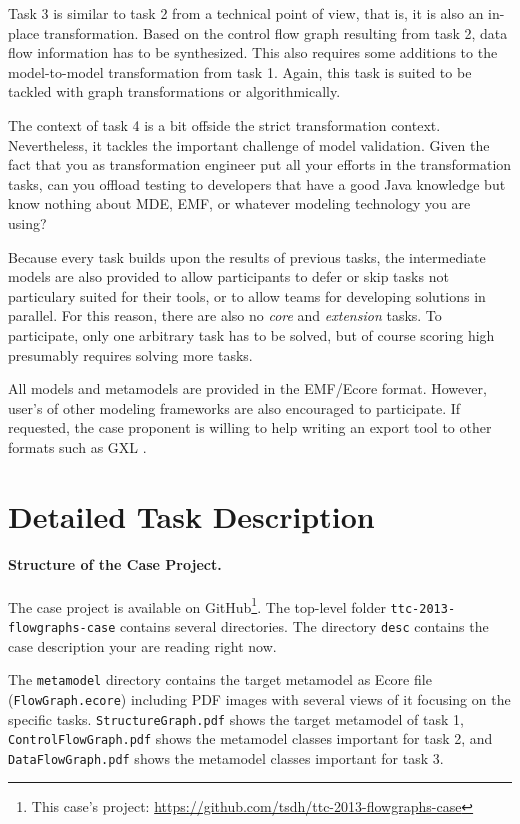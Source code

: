 \documentclass[10pt]{article}
\begin{document}
Task 3 is similar to task 2 from a technical point of view, that is, it is also
an in-place transformation.  Based on the control flow graph resulting from
task 2, data flow information has to be synthesized.  This also requires some
additions to the model-to-model transformation from task 1.  Again, this task
is suited to be tackled with graph transformations or algorithmically.

The context of task 4 is a bit offside the strict transformation context.
Nevertheless, it tackles the important challenge of model validation.  Given
the fact that you as transformation engineer put all your efforts in the
transformation tasks, can you offload testing to developers that have a good
Java knowledge but know nothing about MDE, EMF, or whatever modeling technology
you are using?

Because every task builds upon the results of previous tasks, the intermediate
models are also provided to allow participants to defer or skip tasks not
particulary suited for their tools, or to allow teams for developing solutions
in parallel.  For this reason, there are also no \emph{core} and
\emph{extension} tasks.  To participate, only one arbitrary task has to be
solved, but of course scoring high presumably requires solving more tasks.


All models and metamodels are provided in the EMF/Ecore format.  However,
user's of other modeling frameworks are also encouraged to participate.  If
requested, the case proponent is willing to help writing an export tool to
other formats such as GXL \cite{GXL02}.


\section{Detailed Task Description}
\label{sec:task-descr}

\paragraph{Structure of the Case Project.}

The case project is available on GitHub\footnote{This case's project:
  \url{https://github.com/tsdh/ttc-2013-flowgraphs-case}}. The top-level folder
\verb|ttc-2013-flowgraphs-case| contains several directories.  The directory
\verb|desc| contains the case description your are reading right now.

The \verb|metamodel| directory contains the target metamodel as Ecore file
(\verb|FlowGraph.ecore|) including PDF images with several views of it focusing
on the specific tasks.  \verb|StructureGraph.pdf| shows the target metamodel of
task 1, \verb|ControlFlowGraph.pdf| shows the metamodel classes important for
task 2, and \verb|DataFlowGraph.pdf| shows the metamodel classes important for
task 3.
\end{document}
